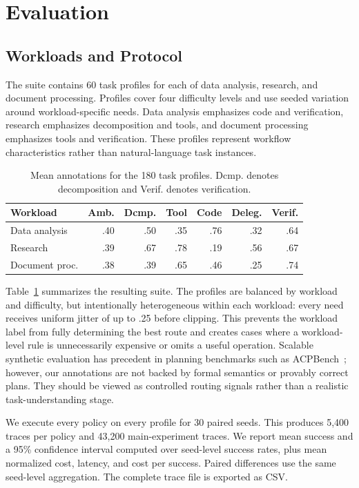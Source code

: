 \documentclass[sigconf]{acmart}
\begin{document}
\section{Evaluation}

\subsection{Workloads and Protocol}

The suite contains 60 task profiles for each of data analysis, research, and document processing. Profiles cover four difficulty levels and use seeded variation around workload-specific needs. Data analysis emphasizes code and verification, research emphasizes decomposition and tools, and document processing emphasizes tools and verification. These profiles represent workflow characteristics rather than natural-language task instances.

\begin{table}[t]
\caption{Mean annotations for the 180 task profiles. Dcmp. denotes decomposition and Verif. denotes verification.}
\label{tab:workloads}
\small
\begin{tabular}{lrrrrrr}
\toprule
Workload & Amb. & Dcmp. & Tool & Code & Deleg. & Verif. \\
\midrule
Data analysis & .40 & .50 & .35 & .76 & .32 & .64 \\
Research & .39 & .67 & .78 & .19 & .56 & .67 \\
Document proc. & .38 & .39 & .65 & .46 & .25 & .74 \\
\bottomrule
\end{tabular}
\end{table}

Table~\ref{tab:workloads} summarizes the resulting suite. The profiles are balanced by workload and difficulty, but intentionally heterogeneous within each workload: every need receives uniform jitter of up to .25 before clipping. This prevents the workload label from fully determining the best route and creates cases where a workload-level rule is unnecessarily expensive or omits a useful operation. Scalable synthetic evaluation has precedent in planning benchmarks such as ACPBench~\cite{kokel2025acpbench}; however, our annotations are not backed by formal semantics or provably correct plans. They should be viewed as controlled routing signals rather than a realistic task-understanding stage.

We execute every policy on every profile for 30 paired seeds. This produces 5,400 traces per policy and 43,200 main-experiment traces. We report mean success and a 95\% confidence interval computed over seed-level success rates, plus mean normalized cost, latency, and cost per success. Paired differences use the same seed-level aggregation. The complete trace file is exported as CSV.
\end{document}
